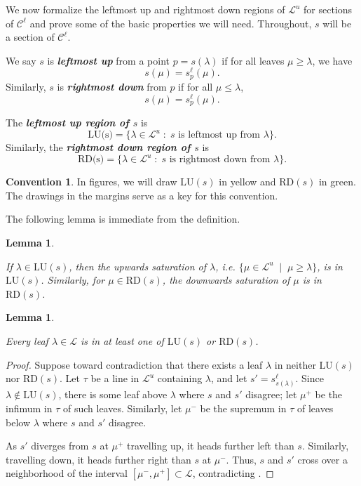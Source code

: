 \documentclass[11pt]{amsart}
\renewcommand{\l}{\lambda}
\newcommand{\mc}{\mathcal}
\newcommand{\defn}[1]{\textbf{\emph{#1}}}
\newcommand{\lu}{\mathrm{LU}}
\newcommand{\rd}{\mathrm{RD}}
\numberwithin{equation}{section}
\newtheorem{lemma}[equation]{Lemma}
\theoremstyle{definition}
\newtheorem{convention}[equation]{Convention}
\begin{document}
We now formalize the leftmost up and rightmost down regions of $\mc L^u$ for sections of $\mc C^\ell$ and prove some of the basic properties we will need. Throughout, $s$ will be a section of $\mc C^\ell$.

\begin{definition}\label{def:leftup}
	
	We say $s$ is \defn{leftmost up} from a point $p=s(\l)$ if for all leaves $\mu\geq\l$, we have
	\[
	s(\mu)=s^\ell_p(\mu).
	\]
	Similarly, $s$ is \defn{rightmost down} from $p$ if for all $\mu\leq\l$,
	\[
	s(\mu)=s^\ell_p(\mu).
	\]
\end{definition}

\begin{definition}\label{def:lu}

	The \defn{leftmost up region of $s$} is
	\[
	\text{LU(s)}=\{\lambda\in\mc L^u\;\colon\;s\text{ is leftmost up from }\lambda\}.
	\] 
	Similarly, the \defn{rightmost down region of $s$} is
	\[
	\text{RD(s)}=\{\lambda\in\mc L^u\;\colon\;s\text{ is rightmost down from }\lambda\}.
	\] 
\end{definition}

\begin{convention}\label{conv:lurd}
	In figures, we will draw $\lu(s)$ in yellow and $\rd(s)$ in green. The drawings in the margins serve as a key for this convention.
\end{convention}

The following lemma is immediate from the definition.

\begin{lemma}\label{lem:up_sat}

	If $\lambda\in\text{LU}(s)$, then the upwards saturation of $\lambda$, i.e. $\{\mu\in\mc L^u\;\mid\;\mu\geq\l\}$, is in $\text{LU}(s)$. Similarly, for $\mu\in\text{RD}(s)$, the downwards saturation of $\mu$ is in $\text{RD}(s)$.
\end{lemma}

\begin{lemma}\label{lem:lu_or_rd}

	Every leaf $\lambda\in\mc L$ is in at least one of $\lu(s)$ or $\rd(s)$.
\end{lemma}

\begin{proof}
	Suppose toward contradiction that there exists a leaf $\l$ in neither $\lu(s)$ nor $\rd(s)$. Let $\tau$ be a line in $\mc L^u$ containing $\l$, and let $s'=s^\ell_{s(\l)}$. Since $\l\notin \lu(s)$, there is some leaf above $\l$ where $s$ and $s'$ disagree; let $\mu^+$ be the infimum in $\tau$ of such leaves. Similarly, let $\mu^-$ be the supremum in $\tau$ of leaves below $\l$ where $s$ and $s'$ disagree. 
	
	As $s'$ diverges from $s$ at $\mu^+$ travelling up, it heads further left than $s$. Similarly, travelling down, it heads further right than $s$ at $\mu^-$. Thus, $s$ and $s'$ cross over a neighborhood of the interval $[\mu^-,\mu^+]\subset\mc L$, contradicting \cite[Section 6.14]{CalDun_UC}.
\end{proof}
\end{document}
